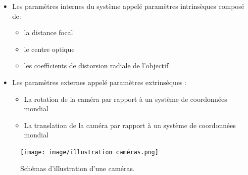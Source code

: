   \begin{itemize}
  	\item  Les paramètres internes  du système appelé paramètres intrinsèques composé de:\\
  	
  	\begin{itemize}
  		\item la distance focal
  		\item le centre optique
  		\item les coefficients de distorsion radiale de l'objectif\\
  	\end{itemize}
  	
  	\item Les paramètres externes appelé paramètres extrinsèques :\\
  	
  	\begin{itemize}
  		\item La rotation de la caméra par rapport à un système de coordonnées mondial
  		\item La translation de la caméra par rapport à un système de coordonnées mondial
  	\end{itemize}
  	
  \end{itemize}
 
		\begin{figure}[th]
			\centering
		\texttt{[image: image/illustration caméras.png]}
			\decoRule
			\caption[Illustration d'une caméras]{Schémas d'illustration d'une caméras.}
			\label{fig:Illustration caméras}
		\end{figure}

